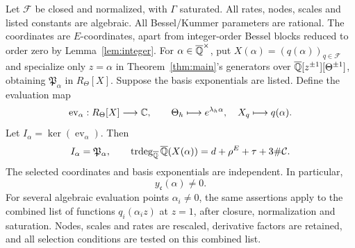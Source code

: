 \begin{theorem}\label{thm:values}
Let $\mathcal F$ be closed and normalized, with $\Gamma$ saturated.
All rates, nodes, scales and listed constants are algebraic.
All Bessel/Kummer parameters are rational.
The coordinates are $E$-coordinates, apart from integer-order Bessel blocks
reduced to order zero by Lemma~\ref{lem:integer}.
For $\alpha\in{\overline{\mathbb{Q}}}^\times$, put $X(\alpha)=(q(\alpha))_{q\in\mathcal F}$
and specialize only
$z=\alpha$ in Theorem~\ref{thm:main}'s generators over
${\overline{\mathbb{Q}}}[z^{\pm1}][\Theta^{\pm1}]$, obtaining $\mathfrak P_\alpha$ in
$R_\Theta[X]$. Suppose the basis exponentials are listed.
Define the evaluation map
\[
 \operatorname{ev}_\alpha:R_\Theta[X]\longrightarrow\mathbb{C},
 \qquad \Theta_h\longmapsto e^{\lambda_h\alpha},\quad
 X_q\longmapsto q(\alpha).
\]
Let $I_\alpha=\ker(\operatorname{ev}_\alpha)$. Then
\begin{equation}\label{eq:value-ideal}
I_\alpha=\mathfrak P_\alpha,\qquad
\operatorname{trdeg}_{{\overline{\mathbb{Q}}}}{\overline{\mathbb{Q}}}(X(\alpha))=d+\rho^E+\tau+3\#\mathcal C.
\end{equation}
The selected coordinates and basis exponentials are independent.
In particular,
\begin{equation}\label{eq:value-nonzero}
y_{\mathfrak c}(\alpha)\ne0.
\end{equation}
For several algebraic evaluation points $\alpha_i\ne0$, the same
assertions apply to the combined list of functions $q_i(\alpha_i z)$
at $z=1$, after closure, normalization and saturation. Nodes, scales
and rates are rescaled, derivative factors are retained, and all
selection conditions are tested on this combined list.
\end{theorem}

